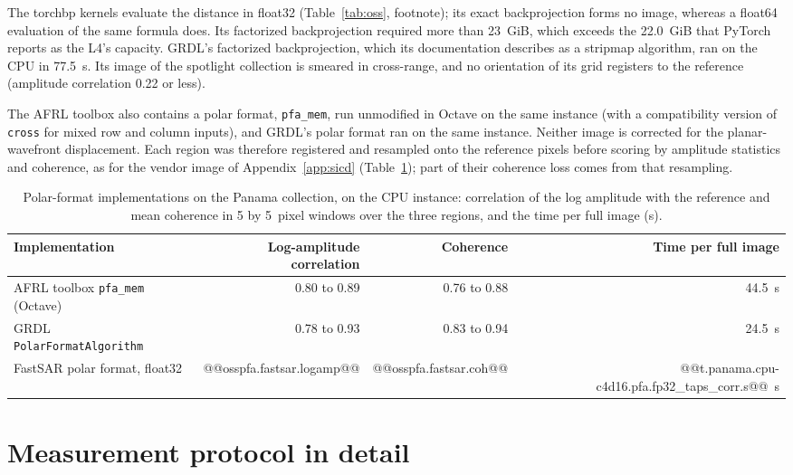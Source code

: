 \documentclass[11pt]{article}
\begin{document}
The torchbp kernels evaluate the distance in float32 (Table~\ref{tab:oss}, footnote); its exact backprojection forms no image, whereas a float64 evaluation of the same formula does. Its factorized backprojection required more than 23~GiB, which exceeds the 22.0~GiB that PyTorch reports as the L4's capacity. GRDL's factorized backprojection, which its documentation describes as a stripmap algorithm, ran on the CPU in 77.5~s. Its image of the spotlight collection is smeared in cross-range, and no orientation of its grid registers to the reference (amplitude correlation 0.22 or less).

The AFRL toolbox also contains a polar format, \texttt{pfa\_mem}, run unmodified in Octave on the same instance (with a compatibility version of \texttt{cross} for mixed row and column inputs), and GRDL's polar format ran on the same instance. Neither image is corrected for the planar-wavefront displacement. Each region was therefore registered and resampled onto the reference pixels before scoring by amplitude statistics and coherence, as for the vendor image of Appendix~\ref{app:sicd} (Table~\ref{tab:osspfa}); part of their coherence loss comes from that resampling.

\begin{table}[tbp]
\centering
\caption{Polar-format implementations on the Panama collection, on the CPU instance: correlation of the log amplitude with the reference and mean coherence in 5 by 5~pixel windows over the three regions, and the time per full image (s).}
\label{tab:osspfa}
\small
\begin{tabular}{lrrr}
\toprule
Implementation & Log-amplitude correlation & Coherence & Time per full image \\
\midrule
AFRL toolbox \texttt{pfa\_mem} (Octave) & 0.80 to 0.89 & 0.76 to 0.88 & 44.5~s \\
GRDL \texttt{PolarFormatAlgorithm} & 0.78 to 0.93 & 0.83 to 0.94 & 24.5~s \\
FastSAR polar format, float32 & @@osspfa.fastsar.logamp@@ & @@osspfa.fastsar.coh@@ & @@t.panama.cpu-c4d16.pfa.fp32_taps_corr.s@@~s \\
\bottomrule
\end{tabular}
\end{table}

\section{Measurement protocol in detail}
\label{app:protocol}
\end{document}
